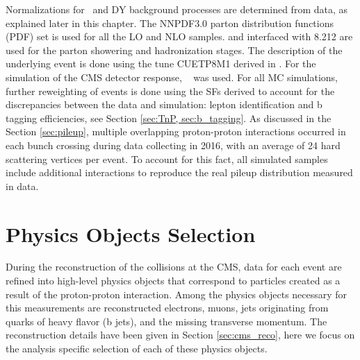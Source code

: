 Normalizations for \ttbar ~and DY
background processes are determined from data, as explained later in this chapter.
%
%
The NNPDF3.0 \cite{Ball:2014uwa} parton distribution functions
(PDF) set is used for all the LO and NLO samples. {\POWHEG} and {\MGMCatNLO} interfaced with
{\PYTHIA}8.212 are used for the parton
showering and hadronization stages. The description of the underlying event is done using 
the tune CUETP8M1 derived in \cite{Khachatryan:2015pea}. For the simulation of the CMS detector response, \GEANTfour~\cite{GEANT4} was used. 
%
%
For all MC simulations, further reweighting of events is done using the SFs derived to account for 
 the discrepancies between the data and simulation: lepton identification and b tagging efficiencies, see Section \ref{sec:TnP, sec:b_tagging}.
%
%
As discussed in the Section \ref{sec:pileup}, multiple overlapping
proton-proton interactions occurred in each bunch crossing during data collecting in 2016, with
an average of 24 hard scattering vertices per event. To account for this fact, all simulated samples include additional interactions
to reproduce the real pileup distribution measured in data.

\section{Physics Objects Selection}
\label{sec:objects}


During the reconstruction of the collisions at the CMS, data for each event are refined into high-level physics objects that correspond to particles created as a result of the proton-proton interaction. Among the physics objects necessary for this measurements are reconstructed electrons, muons, jets originating from quarks of heavy flavor (b jets), and the missing transverse momentum. The reconstruction details have been given in Section \ref{sec:cms_reco}, here we focus on the analysis specific selection of each of these physics objects.

